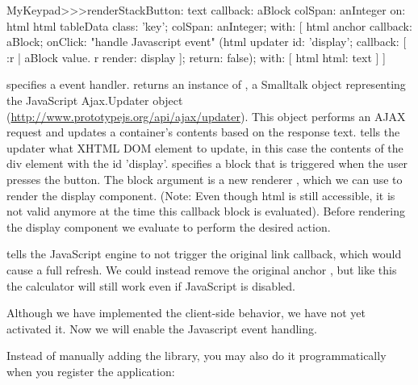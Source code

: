 \documentclass[a4paper,10pt,twoside]{book}
\begin{document}
\begin{code}{}
MyKeypad>>>renderStackButton: text callback: aBlock colSpan: anInteger on: html 
	html tableData
		class: 'key';
		colSpan: anInteger;
		with: [
			html anchor
				callback: aBlock;
				onClick:				"handle Javascript event"
					(html updater
						id: 'display';
						callback: [ :r |
							aBlock value.
							r render: display ];
						return: false);
				with: [ html html: text ] ]
\end{code}

 specifies a  event handler.
 returns an instance of , a Smalltalk object representing the JavaScript Ajax.Updater object (\url{http://www.prototypejs.org/api/ajax/updater}).
This object performs an AJAX request and updates a container's contents based on the response text.
 tells the updater what XHTML DOM element to update, in this case the contents of the div element with the id 'display'.
 specifies a block that is triggered when the user presses the button.
The block argument is a new renderer , which we can use to render the display component.
(Note: Even though html is still accessible, it is not valid anymore at the time this callback block is evaluated).
Before rendering the display component we evaluate  to perform the desired action.

 tells the JavaScript engine to not trigger the original link callback, which would cause a full refresh.
We could instead remove the original anchor , but like this the calculator will still work even if JavaScript is disabled.


Although we have implemented the client-side behavior, we have not yet activated it.
Now we will enable the Javascript event handling.


Instead of manually adding the library, you may also do it programmatically when you register the application:
\begin{code}{}
MyCalculator class>>>initialize
	(self registerAsApplication: 'rpn')
		addLibrary: SULibrary}}
\end{code}
\end{document}
